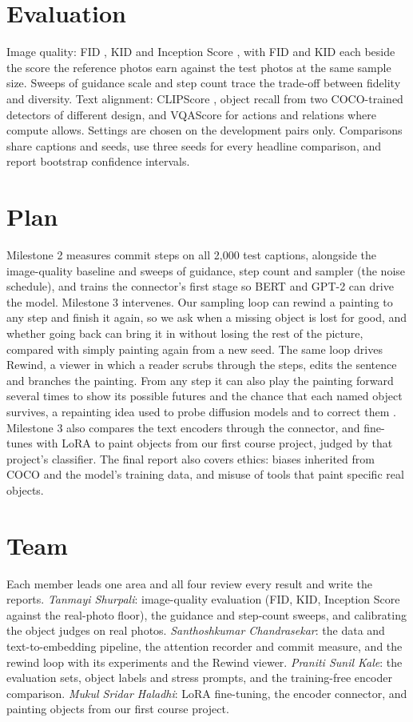 \documentclass[conference]{IEEEtran}
\begin{document}
\section{Evaluation}
Image quality: FID \cite{fid}, KID \cite{kid} and Inception Score \cite{is}, with FID and KID each beside the score the reference photos earn against the test photos at the same sample size. Sweeps of guidance scale and step count trace the trade-off between fidelity and diversity. Text alignment: CLIPScore \cite{clipscore}, object recall from two COCO-trained detectors of different design, and VQAScore \cite{vqascore} for actions and relations where compute allows. Settings are chosen on the development pairs only. Comparisons share captions and seeds, use three seeds for every headline comparison, and report bootstrap confidence intervals.

\section{Plan}
Milestone 2 measures commit steps on all 2{,}000 test captions, alongside the image-quality baseline and sweeps of guidance, step count and sampler (the noise schedule), and trains the connector's first stage so BERT and GPT-2 can drive the model. Milestone 3 intervenes. Our sampling loop can rewind a painting to any step and finish it again, so we ask when a missing object is lost for good, and whether going back can bring it in without losing the rest of the picture, compared with simply painting again from a new seed. The same loop drives Rewind, a viewer in which a reader scrubs through the steps, edits the sentence and branches the painting. From any step it can also play the painting forward several times to show its possible futures and the chance that each named object survives, a repainting idea used to probe diffusion models \cite{phase} and to correct them \cite{resample}. Milestone 3 also compares the text encoders through the connector, and fine-tunes with LoRA to paint objects from our first course project, judged by that project's classifier. The final report also covers ethics: biases inherited from COCO and the model's training data, and misuse of tools that paint specific real objects.

\section{Team}
Each member leads one area and all four review every result and write the reports. \emph{Tanmayi Shurpali}: image-quality evaluation (FID, KID, Inception Score against the real-photo floor), the guidance and step-count sweeps, and calibrating the object judges on real photos. \emph{Santhoshkumar Chandrasekar}: the data and text-to-embedding pipeline, the attention recorder and commit measure, and the rewind loop with its experiments and the Rewind viewer. \emph{Praniti Sunil Kale}: the evaluation sets, object labels and stress prompts, and the training-free encoder comparison. \emph{Mukul Sridar Haladhi}: LoRA fine-tuning, the encoder connector, and painting objects from our first course project.
\end{document}
